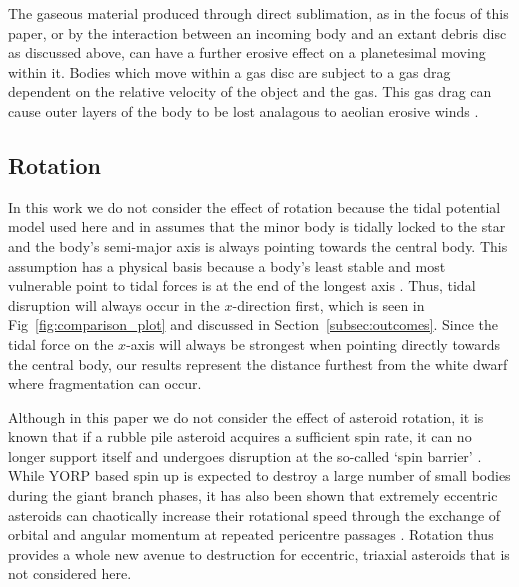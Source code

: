 \documentclass[fleqn,usenatbib]{mnras}
\begin{document}
The gaseous material produced through direct sublimation, as in the focus of this paper, or by the interaction between an incoming body and an extant debris disc as discussed above, can have a further erosive effect on a planetesimal moving within it. 
Bodies which move within a gas disc are subject to a gas drag dependent on the relative velocity of the object and the gas. 
This gas drag can cause outer layers of the body to be lost analagous to aeolian erosive winds \citep{Rozner2021}.

\subsection{Rotation} \label{sec:rotation}
In this work we do not consider the effect of rotation because the tidal potential model used here and in \cite{Dobrovolskis2019} assumes that the minor body is tidally locked to the star and the body's semi-major axis is always pointing towards the central body. 
This assumption has a physical basis because a body's least stable and most vulnerable point to tidal forces is at the end of the longest axis \citep{Harris1996}.
Thus, tidal disruption will always occur in the $x$-direction first, which is seen in Fig~\ref{fig:comparison_plot} and discussed in Section~\ref{subsec:outcomes}.
Since the tidal force on the $x$-axis will always be strongest when pointing directly towards the central body, our results represent the distance furthest from the white dwarf where fragmentation can occur.

Although in this paper we do not consider the effect of asteroid rotation, it is known that if a rubble pile asteroid acquires a sufficient spin rate, it can no longer support itself and undergoes disruption at the so-called `spin barrier' \citep[see fig.~1 of][]{Hestroffer2019}.
While YORP based spin up is expected to destroy a large number of small bodies during the giant branch phases, it has also been shown that extremely eccentric asteroids can chaotically increase their rotational speed through the exchange of orbital and angular momentum at repeated pericentre passages \citep{Makarov2019, Veras2020a}. 
Rotation thus provides a whole new avenue to destruction for eccentric, triaxial asteroids that is not considered here. 
\end{document}

